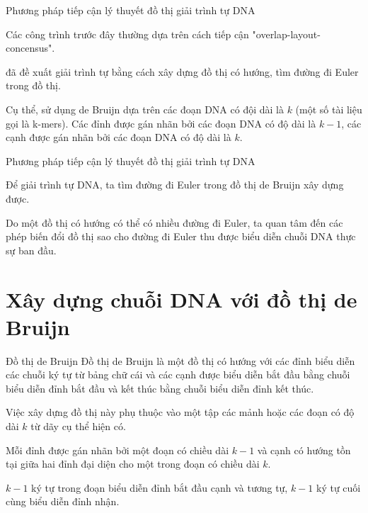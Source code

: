 \documentclass[10pt]{beamer}
\theoremstyle{remark}
\numberwithin{algocf}{section}
\numberwithin{equation}{section}
\numberwithin{dl}{section}
\numberwithin{figure}{section}
\begin{document}
\begin{frame}{Phương pháp tiếp cận lý thuyết đồ thị giải trình tự DNA}


    Các công trình trước đây thường dựa trên cách tiếp cận "overlap-layout-concensus".

    \cite{idury1995new} đã đề xuất giải trình tự bằng cách xây dựng đồ thị có hướng, tìm đường đi Euler trong đồ thị.

    Cụ thể, \cite{idury1995new} sử dụng de Bruijn dựa trên các đoạn DNA có đội dài là $k$ (một số tài liệu gọi là k-mers).
    Các đỉnh được gán nhãn bởi các đoạn DNA có độ dài là $k-1$, các cạnh được gán nhãn bởi các đoạn DNA có độ dài là $k$.
\end{frame}

\begin{frame}{Phương pháp tiếp cận lý thuyết đồ thị giải trình tự DNA}

    Để giải trình tự DNA, ta tìm đường đi Euler trong đồ thị de Bruijn xây dựng được.

    Do một đồ thị có hướng có thể có nhiều đường đi Euler, ta quan tâm đến các phép biến đổi đồ thị sao cho đường đi Euler thu được biểu diễn chuỗi DNA thực sự ban đầu.

    
\end{frame}

\section{Xây dựng chuỗi DNA với đồ thị de Bruijn}

\begin{frame}{Đồ thị de Bruijn}
    Đồ thị de Bruijn là một đồ thị có hướng với các đỉnh biểu diễn các chuỗi ký tự từ bảng chữ cái và các cạnh được biểu diễn bắt đầu bằng chuỗi biểu diễn đỉnh bắt đầu và kết thúc bằng chuỗi biểu diễn đỉnh kết thúc.

    Việc xây dựng đồ thị này phụ thuộc vào một tập các mảnh hoặc các đoạn có độ dài $k$ từ dãy cụ thể hiện có.

    Mỗi đỉnh được gán nhãn bởi một đoạn có chiều dài $k-1$ và cạnh có hướng tồn tại giữa hai đỉnh đại diện cho một trong đoạn có chiều dài $k$.

    $k-1$ ký tự trong đoạn biểu diễn đỉnh bắt đầu cạnh và tương tự, $k-1$ ký tự cuối cùng biểu diễn đỉnh nhận.

\end{frame}
\end{document}
